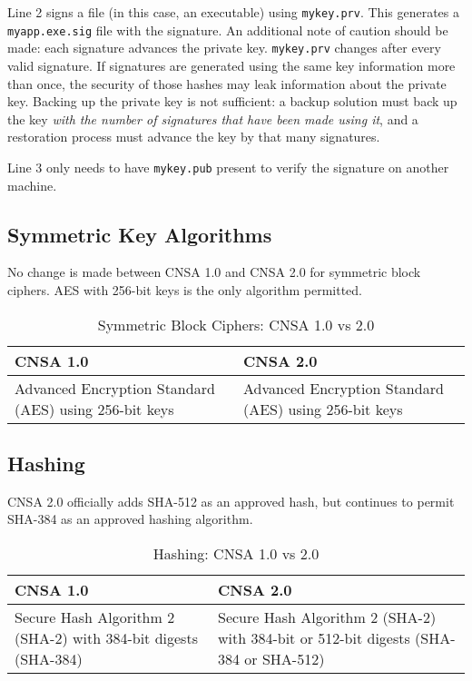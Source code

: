Line 2 signs a file (in this case, an executable) using \texttt{mykey.prv}. This generates a \texttt{myapp.exe.sig} file with the signature. An additional note of caution should be made: each signature advances the private key. \texttt{mykey.prv} changes after every valid signature. If signatures are generated using the same key information more than once, the security of those hashes may leak information about the private key. Backing up the private key is not sufficient: a backup solution must back up the key \textit{with the number of signatures that have been made using it}, and a restoration process must advance the key by that many signatures.

Line 3 only needs to have \texttt{mykey.pub} present to verify the signature on another machine.


\subsection{Symmetric Key Algorithms}

No change is made between CNSA 1.0 and CNSA 2.0 for symmetric block ciphers. AES with 256-bit keys is the only algorithm permitted.

\begin{table}
\begin{tabular}{|p{}|p{}|}
	\hline
	\textbf{CNSA 1.0} & \textbf{CNSA 2.0} \\
	\hline
	Advanced Encryption Standard (AES) using 256-bit keys & Advanced Encryption Standard (AES) using 256-bit keys \\
	\hline
\end{tabular}
\caption{Symmetric Block Ciphers: CNSA 1.0 vs 2.0}
\end{table}

\subsection{Hashing}

CNSA 2.0 officially adds SHA-512 as an approved hash, but continues to permit SHA-384 as an approved hashing algorithm.
\begin{table}
\begin{tabular}{|p{}|p{}|}
	\hline
	\textbf{CNSA 1.0} & \textbf{CNSA 2.0} \\
	\hline
	Secure Hash Algorithm 2 (SHA-2) with 384-bit digests (SHA-384) & Secure Hash Algorithm 2 (SHA-2) with 384-bit or 512-bit digests (SHA-384 or SHA-512) \\
	\hline
\end{tabular}
\caption{Hashing: CNSA 1.0 vs 2.0}
\end{table}

